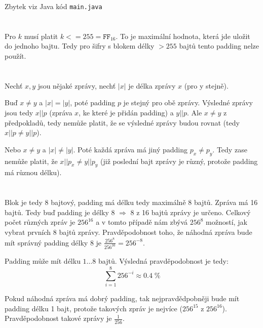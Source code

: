 \documentclass[12pt, a4paper]{article}
\begin{document}
Zbytek viz Java kód \texttt{main.java}

\section{}
Pro $k$ musí platit $k<=255 = \texttt{FF}_{16}$. To je maximální hodnota, která jde uložit do jednoho bajtu. Tedy pro šifry s blokem délky $>255$ bajtů tento padding nelze použít.

\section{}
Nechť $x,y$ jsou nějaké zprávy, nechť $|x|$ je délka zprávy $x$ (pro y stejně).

Buď $x\neq y$ a $|x|=|y|$, poté padding $p$ je stejný pro obě zprávy. Výsledné zprávy jsou tedy $x||p$ (zpráva $x$, ke které je přidán padding) a $y||p$. Ale $x \neq y$ z předpokladů, tedy nemůže platit, že se výsledné zprávy budou rovnat (tedy $x||p \neq y||p$).

Nebo $x\neq y$ a $|x| \neq |y|$. Poté každá zpráva má jiný padding $p_x \neq p_y$. Tedy zase nemůže platit, že $x||p_x \neq y||p_y$ (již poslední bajt zprávy je různý, protože padding má různou délku).

\section{}
Blok je tedy 8 bajtový, padding má délku tedy maximálně 8 bajtů. Zpráva má 16 bajtů. Tedy buď padding je délky 8 $\Rightarrow$ 8 z 16 bajtů zprávy je určeno. Celkový počet různých zpráv je $256^{16}$ a v tomto případě nám zbývá $256^8$ možností, jak vybrat prvních 8 bajtů zprávy. Pravděpodobnost toho, že náhodná zpráva bude mít správný padding délky 8 je $\frac{256^8}{256^{16}}=256^{-8}$.

Padding může mít délku $1\dots8$ bajtů. Výsledná pravděpodobnost je tedy:
$$\sum_{i=1}^8 256^{-i} \approx 0.4\; \%$$

Pokud náhodná zpráva má dobrý padding, tak nejpravdědpobněji bude mít padding délku 1 bajt, protože takových zpráv je nejvíce ($256^{15}$ z $256^{16}$). Pravděpodobnost takové zprávy je $\frac{1}{256}$.
\end{document}
